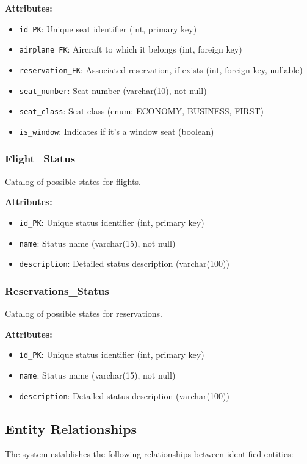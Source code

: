 \documentclass[conference]{IEEEtran}
\begin{document}
    \textbf{Attributes:}
    \begin{itemize}
        \item \texttt{id\_PK}: Unique seat identifier (int, primary key)
        \item \texttt{airplane\_FK}: Aircraft to which it belongs (int, foreign key)
        \item \texttt{reservation\_FK}: Associated reservation, if exists (int, foreign key, nullable)
        \item \texttt{seat\_number}: Seat number (varchar(10), not null)
        \item \texttt{seat\_class}: Seat class (enum: ECONOMY, BUSINESS, FIRST)
        \item \texttt{is\_window}: Indicates if it's a window seat (boolean)
    \end{itemize}

    \subsubsection{Flight\_Status}
    Catalog of possible states for flights.

    \textbf{Attributes:}
    \begin{itemize}
        \item \texttt{id\_PK}: Unique status identifier (int, primary key)
        \item \texttt{name}: Status name (varchar(15), not null)
        \item \texttt{description}: Detailed status description (varchar(100))
    \end{itemize}

    \subsubsection{Reservations\_Status}
    Catalog of possible states for reservations.

    \textbf{Attributes:}
    \begin{itemize}
        \item \texttt{id\_PK}: Unique status identifier (int, primary key)
        \item \texttt{name}: Status name (varchar(15), not null)
        \item \texttt{description}: Detailed status description (varchar(100))
    \end{itemize}

    \subsection{Entity Relationships}
    The system establishes the following relationships between identified entities:
\end{document}
